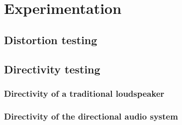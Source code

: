\section{Experimentation}
\subsection{Distortion testing}

\subsection{Directivity testing}
\subsubsection{Directivity of a traditional loudspeaker}

\subsubsection{Directivity of the directional audio system}
